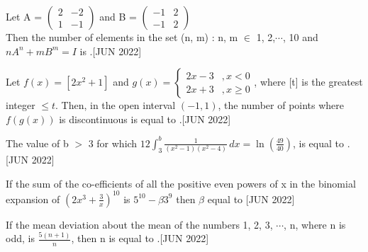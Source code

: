 \iffalse
  \title{Assignment}
  \author{ee24btech11030}
  \section{mcq-single}
\fi

\item Let A = $\begin{pmatrix} 2 & -2 \\ 1 & -1 \end{pmatrix}$ and  B = $\begin{pmatrix} -1 & 2 \\ -1 & 2 \end{pmatrix}$\\
    Then the number of elements in the set {(n, m) : n, m $\in$ { 1, 2,$\cdots$, 10} and $nA^n + mB^m = I$} is \underline{\hspace{1cm}}.\hfill{[JUN 2022]}
    \bigskip
    
    \item Let $f(x) = [2x^2 + 1]$ and 
    $g(x) = \begin{cases} 
    2x - 3 & , x < 0 \\ 
    2x + 3 & , x \geq 0 
    \end{cases}$, where  [t] is the greatest integer $\leq t$. Then, in the open interval $(-1, 1)$, the number of points where $f(g(x))$ is discontinuous is equal to \underline{\hspace{1cm}}.\hfill{[JUN 2022]}
    \bigskip
    
    \item The value of b $>$ 3 for which $12\int_{3}^{b}\frac{1}{(x^2 - 1)(x^2 - 4)} \,dx = \ln{(\frac{49}{40})}$, is equal to \underline{\hspace{1cm}}.\hfill{[JUN 2022]}
    \bigskip
    
    \item If the sum of the co-efficients of all the positive even powers of x in the binomial expansion of $\left(2x^3 + \frac{3}{x}\right)^{10}$ is $5^{10} - {\beta}3^9$ then $\beta$ equal to \underline{\hspace{1cm}}\hfill{[JUN 2022]}
    \bigskip
    
    \item If the mean deviation about the mean of the numbers 1, 2, 3, $\cdots$, n, where n is odd, is $\frac{5(n+1)}{n}$, then n is equal to \underline{\hspace{1cm}}.\hfill{[JUN 2022]}
    \bigskip
    
